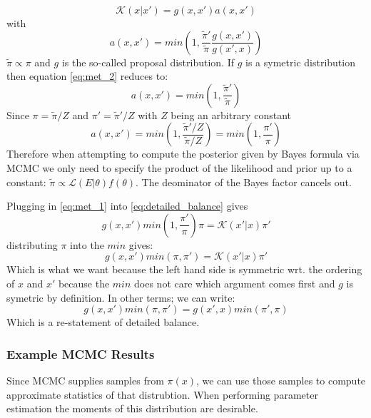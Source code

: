 \documentclass[10pt,a4paper]{report}
\begin{document}
\begin{equation}
\mathcal K(x|x') = g(x,x')a(x,x')
\label{eq:met_1}
\end{equation}
with
\begin{equation}
a(x,x') = min \left( 1, \frac{ \tilde \pi'}{\tilde{\pi}} \frac{g(x,x')}{g(x',x)} \right)
\label{eq:met_2}
\end{equation}
$\tilde \pi \propto \pi$ and $g$ is the so-called proposal distribution.  If $g$ is a symetric distribution then equation \ref{eq:met_2} reduces to:
\begin{equation}
a(x,x') = min \left( 1, \frac{ \tilde \pi'}{\tilde{\pi}} \right)
\end{equation}
Since $\pi = \tilde \pi / Z$ and  $\pi' = \tilde \pi' / Z$ with $Z$ being an arbitrary constant
\begin{equation}
a(x,x') = min \left( 1, \frac{ \tilde \pi' / Z}{\tilde \pi/ Z} \right) =  min \left( 1, \frac{ \pi' }{\pi} \right) 
\end{equation}
Therefore when attempting to compute the posterior given by Bayes formula via MCMC we only need to specify the product of the likelihood and prior up to a constant:  $\tilde \pi \propto \mathcal L(E|\theta) f(\theta) $.  The deominator of the Bayes factor cancels out.

Plugging in \ref{eq:met_1} into \ref{eq:detailed_balance} gives
\begin{equation}
g(x,x') min \left( 1, \frac{ \pi' }{\pi} \right) \pi = \mathcal K(x'|x)\pi'
\end{equation}
distributing $\pi$ into the $min$ gives:
\begin{equation}
g(x,x') min \left( \pi, \pi'  \right) = \mathcal K(x'|x)\pi'
\end{equation}
Which is what we want because the left hand side is symmetric wrt. the ordering of $x$ and $x'$ because the $min$ does not care which argument comes first and $g$ is symetric by definition.  In other terms; we can write:
\begin{equation}
g(x,x') min \left( \pi, \pi'  \right) = g(x',x) min \left( \pi', \pi  \right)
\end{equation}
Which is a re-statement of detailed balance.


\subsubsection{Example MCMC Results}

Since MCMC supplies samples from $\pi(x)$, we can use those samples to compute approximate statistics of that distrubtion.  When performing parameter estimation the moments of this distribution are desirable.
\end{document}
